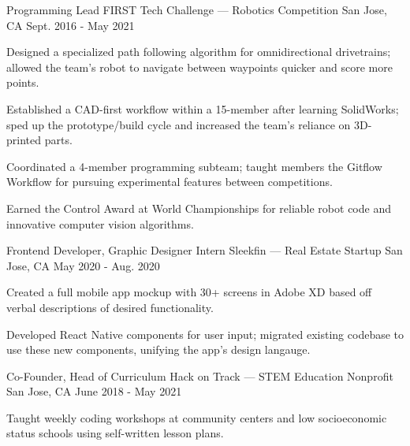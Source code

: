 
\begin{cventries}
  \cventry
  {Programming Lead} %
  {FIRST Tech Challenge --- Robotics Competition} %
  {San Jose, CA} %
  {Sept. 2016 - May 2021} %
  {
    \begin{cvitems} %
      \item {Designed a specialized path following algorithm for omnidirectional drivetrains; allowed the team's robot to navigate between waypoints quicker and score more points.}
      \item {Established a CAD-first workflow within a 15-member after learning SolidWorks; sped up the prototype/build cycle and increased the team's reliance on 3D-printed parts.}
      \item {Coordinated a 4-member programming subteam; taught members the Gitflow Workflow for pursuing experimental features between competitions.}
      \item {Earned the Control Award at World Championships for reliable robot code and innovative computer vision algorithms.}
    \end{cvitems}
  }

  \cventry
  {Frontend Developer, Graphic Designer Intern} %
  {Sleekfin --- Real Estate Startup} %
  {San Jose, CA} %
  {May 2020 - Aug. 2020} %
  {
    \begin{cvitems} %
      \item {Created a full mobile app mockup with 30+ screens in Adobe XD based off verbal descriptions of desired functionality.}
      \item {Developed React Native components for user input; migrated existing codebase to use these new components, unifying the app's design langauge.}
    \end{cvitems}
  }

  \cventry
  {Co-Founder, Head of Curriculum} %
  {Hack on Track --- STEM Education Nonprofit} %
  {San Jose, CA} %
  {June 2018 - May 2021} %
  {
    \begin{cvitems} %
      \item {Taught weekly coding workshops at community centers and low socioeconomic status schools using self-written lesson plans.}
    \end{cvitems}
  }
\end{cventries}
